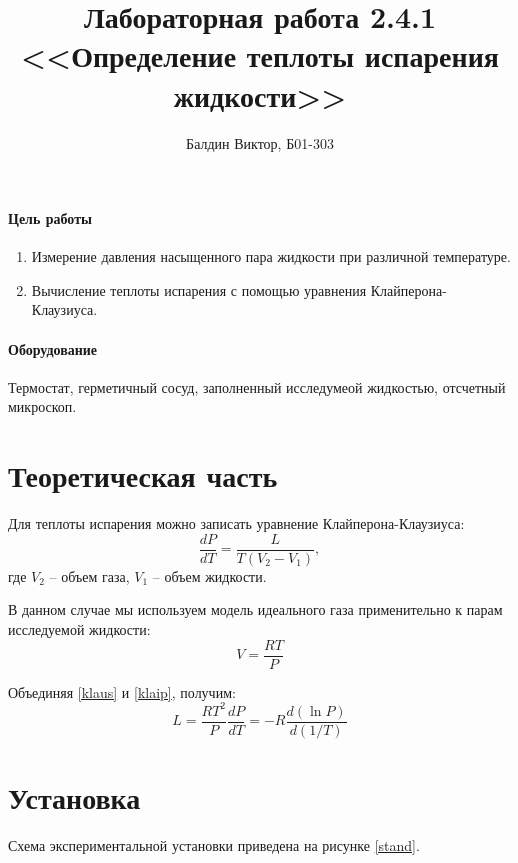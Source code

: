 \documentclass[12pt]{article}
\title{ 
    Лабораторная работа 2.4.1 \\
    <<Определение теплоты испарения жидкости>>
}
\author{Балдин Виктор, Б01-303}
\begin{document}
    \maketitle
    \paragraph{Цель работы}
    \begin{enumerate}
        \item Измерение давления насыщенного пара жидкости при различной 
        температуре.
        \item Вычисление теплоты испарения с помощью уравнения Клайперона-
        Клаузиуса.
    \end{enumerate}
    \paragraph{Оборудование} Термостат, герметичный сосуд, заполненный
    исследумеой жидкостью, отсчетный микроскоп.
    
    \section{Теоретическая часть}
    Для теплоты испарения можно записать уравнение Клайперона-Клаузиуса:
    \begin{equation}
        \frac{dP}{dT} = \frac{L}{T(V_2 - V_1)},
        \label{klaus}
    \end{equation}
    где $V_2$ -- объем газа, $V_1$ -- объем жидкости.
    
    В данном случае мы используем модель идеального газа применительно
    к парам исследуемой жидкости:
    \begin{equation}
        V = \frac{RT}{P}
        \label{klaip}
    \end{equation}
    
    Объединяя \ref{klaus} и \ref{klaip}, получим:
    \begin{equation}
        L = \frac{RT^2}{P}\frac{dP}{dT} = -R\frac{d(\ln P)}{d(1 / T)}
    \end{equation}
    
    \section{Установка}
    Схема экспериментальной установки приведена на рисунке \ref{stand}.
    
\end{document}
